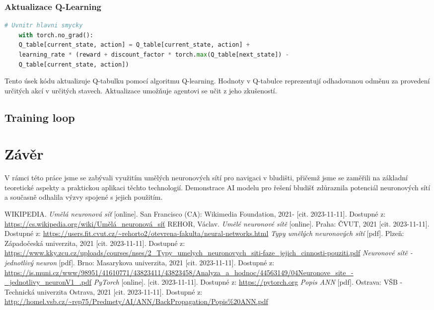 \documentclass[12pt, a4paper,
twoside,        %
openright
]{report}
\begin{document}
\subsection{Aktualizace Q-Learning}
\begin{lstlisting}[language=Python]
	# Uvnitr hlavni smycky
	with torch.no_grad():
	Q_table[current_state, action] = Q_table[current_state, action] + 
	learning_rate * (reward + discount_factor * torch.max(Q_table[next_state]) - 
	Q_table[current_state, action])
\end{lstlisting}
Tento úsek kódu aktualizuje Q-tabulku pomocí algoritmu Q-learning. Hodnoty v Q-tabulce reprezentují odhadovanou odměnu za provedení určitých akcí v určitých stavech. Aktualizace umožňuje agentovi se učit z jeho zkušeností.




\section{Training loop}



	
	\chapter*{Závěr}
	
	V rámci této práce jsme se zabývali využitím umělých neuronových sítí pro navigaci v bludišti, přičemž jsme se zaměřili na základní teoretické aspekty a praktickou aplikaci těchto technologií. Demonstrace AI modelu pro řešení bludišť zdůraznila potenciál neuronových sítí a současně odhalila výzvy spojené s jejich použitím.
	
	\begin{thebibliography}{99}
		 WIKIPEDIA. \textit{Umělá neuronová síť} [online]. San Francisco (CA): Wikimedia Foundation, 2021- [cit. 2023-11-11]. Dostupné z: \url{https://cs.wikipedia.org/wiki/Umělá_neuronová_síť}
		 REHOR, Václav. \textit{Umělé neuronové sítě} [online]. Praha: ČVUT, 2021 [cit. 2023-11-11]. Dostupné z: \url{https://users.fit.cvut.cz/~rehorto2/otevrena-fakulta/neural-networks.html}
		 \textit{Typy umělých neuronových sítí} [pdf]. Plzeň: Západočeská univerzita, 2021 [cit. 2023-11-11]. Dostupné z: \url{https://www.kky.zcu.cz/uploads/courses/nses/2_Typy_umelych_neuronovych_siti-faze_jejich_cinnosti-pouziti.pdf}
		 \textit{Neuronové sítě - jednotlivý neuron} [pdf]. Brno: Masarykova univerzita, 2021 [cit. 2023-11-11]. Dostupné z: \url{https://is.muni.cz/www/98951/41610771/43823411/43823458/Analyza_a_hodnoc/44563149/04Neuronove_site_-_jednotlivy_neuronV1_.pdf}
		 \textit{PyTorch} [online]. [cit. 2023-11-11]. Dostupné z: \url{https://pytorch.org}
		 \textit{Popis ANN} [pdf]. Ostrava: VŠB - Technická univerzita Ostrava, 2021 [cit. 2023-11-11]. Dostupné z: \url{http://homel.vsb.cz/~rep75/Predmety/AI/ANN/BackPropagation/Popis%20ANN.pdf}
		
	\end{thebibliography}
	
\end{document}
